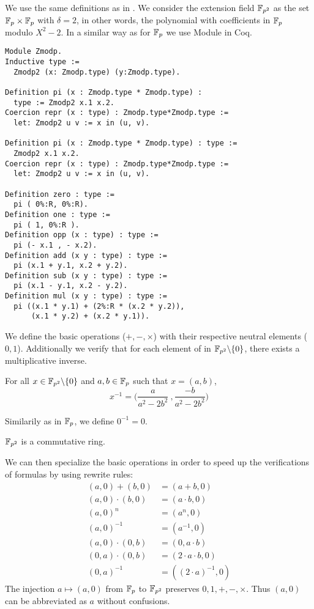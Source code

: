 We use the same definitions as in \cite{Ber06}. We consider the extension field $\mathbb{F}_{p^2}$ as the set $\mathbb{F}_{p} \times \mathbb{F}_{p}$ with $\delta = 2$, in other words,
the polynomial with coefficients in $\mathbb{F}_{p}$ modulo $X^2 - 2$. In a similar way as for $\mathbb{F}_{p}$ we use Module in Coq.
\begin{lstlisting}[language=Coq]
Module Zmodp.
Inductive type :=
  Zmodp2 (x: Zmodp.type) (y:Zmodp.type).

Definition pi (x : Zmodp.type * Zmodp.type) :
  type := Zmodp2 x.1 x.2.
Coercion repr (x : type) : Zmodp.type*Zmodp.type :=
  let: Zmodp2 u v := x in (u, v).

Definition pi (x : Zmodp.type * Zmodp.type) : type :=
  Zmodp2 x.1 x.2.
Coercion repr (x : type) : Zmodp.type*Zmodp.type :=
  let: Zmodp2 u v := x in (u, v).

Definition zero : type :=
  pi ( 0%:R, 0%:R).
Definition one : type :=
  pi ( 1, 0%:R ).
Definition opp (x : type) : type :=
  pi (- x.1 , - x.2).
Definition add (x y : type) : type :=
  pi (x.1 + y.1, x.2 + y.2).
Definition sub (x y : type) : type :=
  pi (x.1 - y.1, x.2 - y.2).
Definition mul (x y : type) : type :=
  pi ((x.1 * y.1) + (2%:R * (x.2 * y.2)),
      (x.1 * y.2) + (x.2 * y.1)).
\end{lstlisting}
We define the basic operations ($+, -, \times$) with their respective neutral elements ($0, 1$).
Additionally we verify that for each element of in $\mathbb{F}_{p^2}\backslash\{0\}$, there exists a multiplicative inverse.
\begin{lemma} For all $x \in \mathbb{F}_{p^2}\backslash\{0\}$ and $a,b \in \mathbb{F}_{p}$ such that $x = (a,b)$,
$$x^{-1} = \Big(\frac{a}{a^2-2b^2}\ , \frac{-b}{a^2-2b^2}\Big)$$
\end{lemma}
Similarily as in $\mathbb{F}_{p}$, we define $0^{-1} = 0$.
\begin{lemma}
$\mathbb{F}_{p^2}$ is a commutative ring.
\end{lemma}
We can then specialize the basic operations in order to speed up the verifications of formulas by using rewrite rules:
\begin{align*}
(a,0) + (b,0) &= (a+b, 0)\\
(a,0) \cdot   (b,0) &= (a \cdot b, 0)\\
(a, 0)^n &= (a^n, 0)\\
(a, 0)^{-1} &= (a^{-1}, 0)\\
(a, 0)\cdot (0,b) &= (0, a\cdot b)\\
(0, a)\cdot (0,b) &= (2\cdot a\cdot b, 0)\\
(0,a)^{-1} &= ((2\cdot a)^{-1},0)
\end{align*}
The injection $a \mapsto (a,0)$ from $\mathbb{F}_{p}$ to $\mathbb{F}_{p^2}$ preserves $0, 1, +, -, \times$. Thus $(a,0)$ can be abbreviated as $a$ without confusions.

